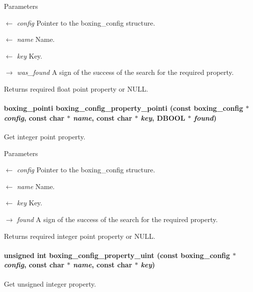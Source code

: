 \begin{DoxyParams}{Parameters}
\item[\mbox{$\leftarrow$} {\em config}]Pointer to the boxing\_\-config structure. \item[\mbox{$\leftarrow$} {\em name}]Name. \item[\mbox{$\leftarrow$} {\em key}]Key. \item[\mbox{$\rightarrow$} {\em was\_\-found}]A sign of the success of the search for the required property. \end{DoxyParams}
\begin{DoxyReturn}{Returns}
required float point property or NULL. 
\end{DoxyReturn}
\hypertarget{group__config_ga4f8f28da2e1a1ce7157f50d6a0a3aa29}{
\paragraph[{boxing\_\-config\_\-property\_\-pointi}]{\setlength{\rightskip}{0pt plus 5cm}boxing\_\-pointi boxing\_\-config\_\-property\_\-pointi (const {\bf boxing\_\-config} $\ast$ {\em config}, \/  const char $\ast$ {\em name}, \/  const char $\ast$ {\em key}, \/  DBOOL $\ast$ {\em found})}\hfill}
\label{group__config_ga4f8f28da2e1a1ce7157f50d6a0a3aa29}
Get integer point property.


\begin{DoxyParams}{Parameters}
\item[\mbox{$\leftarrow$} {\em config}]Pointer to the boxing\_\-config structure. \item[\mbox{$\leftarrow$} {\em name}]Name. \item[\mbox{$\leftarrow$} {\em key}]Key. \item[\mbox{$\rightarrow$} {\em found}]A sign of the success of the search for the required property. \end{DoxyParams}
\begin{DoxyReturn}{Returns}
required integer point property or NULL. 
\end{DoxyReturn}
\hypertarget{group__config_gae64eadea5e49a28c66fd69a01ea1c569}{
\paragraph[{boxing\_\-config\_\-property\_\-uint}]{\setlength{\rightskip}{0pt plus 5cm}unsigned int boxing\_\-config\_\-property\_\-uint (const {\bf boxing\_\-config} $\ast$ {\em config}, \/  const char $\ast$ {\em name}, \/  const char $\ast$ {\em key})}\hfill}
\label{group__config_gae64eadea5e49a28c66fd69a01ea1c569}
Get unsigned integer property.


